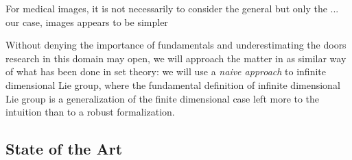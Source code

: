 For medical images, it is not necessarily to consider the general but only the ... our case, images appears to be simpler

Without denying the importance of fundamentals and underestimating the doors research in this domain may open, we will approach the matter in as similar way of what has been done in set theory: we will use a \emph{naive approach} to infinite dimensional Lie group, where the fundamental definition of infinite dimensional Lie group is a generalization of the finite dimensional case left more to the intuition than to a robust formalization. 

\subsection{State of the Art}\label{se:state_of_the_art}


